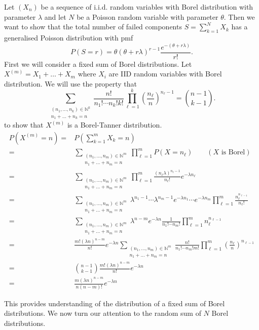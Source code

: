 \documentclass{article}
\renewcommand{\l}{\ell}
\begin{document}
Let $(X_n)$ be a sequence of i.i.d. random variables with Borel distribution with parameter $\lambda$ and let $N$ be a Poisson random variable with parameter $\theta$. Then we want to show that the total number of failed components $S=\sum_{k=1}^{N}X_k$ has a generalised Poisson distribution with pmf
\[P(S=r) = \theta(\theta + r\lambda)^{r-1} \frac{e^{-(\theta+r\lambda)}}{r!}.\]
First we will consider a fixed sum of Borel distributions. Let $X^{(m)}= X_1+\dots+X_m$ where $X_i$ are IID random variables with Borel distribution. We will use the property that 
\[\sum_{\substack{(n_1,\dots,n_k)\in \mathbb{N}^k\\ n_1+\dots+n_k=n}} \frac{n!}{n_1!\cdots n_k! k!} \prod_{\l=1}^{k} \left(\frac{n_\l}{n}\right)^{n_\l-1} = {n-1\choose k-1}.\]
to show that $X^{(m)}$ is a Borel-Tanner distribution.
\[\begin{aligned}
P(X^{(m)}=n) =&  P \left( \sum_{k=1}^{m} X_k=n \right)\\
=& \sum_{\substack{(n_1,\dots,n_m)\in \mathbb{N}^m\\ n_1+\dots+n_m=n}} \prod_{\l=1}^{m} P(X=n_\l) \qquad (X \text{ is Borel})\\
=& \sum_{\substack{(n_1,\dots,n_m)\in \mathbb{N}^m\\ n_1+\dots+n_m=n}} \prod_{\l=1}^{m} \frac{(n_\l\lambda)^{n_\l-1}}{n_\l!}e^{-\lambda n_\l} \\
=& \sum_{\substack{(n_1,\dots,n_m)\in \mathbb{N}^m\\ n_1+\dots+n_m=n}} \lambda^{n_1-1}\cdots\lambda^{n_m-1}e^{-\lambda n_1}\cdots e^{-\lambda n_m} \prod_{\l=1}^{m} \frac{n_\l^{n_{\l-1}}}{n_\l!}\\
=& \sum_{\substack{(n_1,\dots,n_m)\in \mathbb{N}^m\\ n_1+\dots+n_m=n}} \lambda^{n-m} e^{-\lambda n} \frac{1}{n_1!\cdots n_m!} \prod_{\l=1}^{m} n_\l^{n_{\l-1}}\\
=& \frac{m! (\lambda n)^{n-m}}{n!}e^{-\lambda n} \sum_{\substack{(n_1,\dots,n_m)\in \mathbb{N}^m\\ n_1+\dots+n_m=n}} \frac{n!}{n_1!\cdots n_m!m!}  \prod_{\l=1}^{m} \left(\frac{n_\l}{n}\right)^{n_{\l-1}}\\
=&{n-1\choose k-1} \frac{m! (\lambda n)^{n-m}}{n!} e^{-\lambda n}\\
=& \frac{m(\lambda n)^{n-m}}{n(n-m)!}e^{-\lambda n}
\end{aligned} \]

This provides understanding of the distribution of a fixed sum of Borel distributions. We now turn our attention to the random sum of $N$ Borel distributions.
\end{document}
